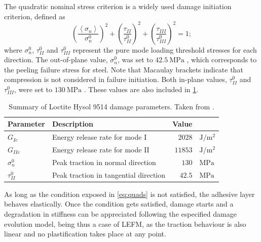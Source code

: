 \documentclass[cmfonts]{witpress}
\begin{document}
The quadratic nominal stress criterion is a widely used damage initiation criterion, defined as
\begin{equation}
\left(\frac{\left<\sigma_{n}\right>}{\sigma_{n}^{0}}\right)^{2} + \left(\frac{\tau_{II}}{\tau_{II}^{0}}\right)^{2} + \left(\frac{\tau_{III}}{\tau_{III}^{0}}\right)^{2} = 1 ;
\label{eq:quads}
\end{equation}
where $\sigma_{n}^{0}$, $\tau_{II}^{0}$ and $\tau_{III}^{0}$ represent the pure mode loading threshold stresses for each direction. The out-of-plane value, $\sigma_{n}^{0}$, was set to $\SI{42.5}{\MPa}$ \cite{Scattina2011}, which corresponds to the peeling failure stress for steel. Note that Macaulay brackets indicate that compression is not considered in failure initiation. Both in-plane values, $\tau_{II}^{0}$ and $\tau_{III}^{0}$, were set to $\SI{130}{\MPa}$ \cite{Scattina2011}. These values are also included in \cref{tab:ads_dmg_params}. %

\begin{table}
	\centering
	\begin{tabular}{llrl}

		\toprule

		Parameter & Description & Value & \\

		\midrule

		$G_{Ic}$ & Energy release rate for mode I & $\num{2028}$ & $\si{\J/\m^2}$ \\
		$G_{IIc}$ & Energy release rate for mode II & $\num{11853}$ & $\si{\J/\m^2}$ \\
		$\sigma_{n}^{0}$ & Peak traction in normal direction & $\num{130}$ & $\si{\MPa}$ \\
		$\tau_{II}^{0}$ & Peak traction in tangential direction & $\num{42.5}$ & $\si{\MPa}$ \\

		\bottomrule

	\end{tabular}
	\caption[Summary of Loctite Hysol 9514 damage parameters.]{Summary of Loctite Hysol 9514 damage parameters. Taken from \cite{Scattina2011}.}
	\label{tab:ads_dmg_params}
\end{table}

As long as the condition exposed in \cref{eq:quads} is not satisfied, the adhesive layer behaves elastically. Once the condition gets satisfied, damage starts and a degradation in stiffness can be appreciated following the especified damage evolution model, being thus a case of LEFM, as the traction behaviour is also linear and no plastification takes place at any point.
\end{document}
